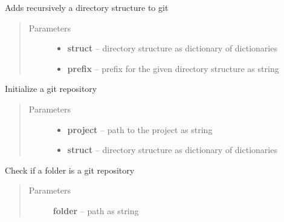 \documentclass[letterpaper,10pt,english]{sphinxmanual}
\begin{document}
\begin{fulllineitems}
\label{_rst/pyscaffold:pyscaffold.repo.git_tree_add}
Adds recursively a directory structure to git
\begin{quote}\begin{description}
\item[{Parameters}] \leavevmode\begin{itemize}
\item {} 
\textbf{struct} -- directory structure as dictionary of dictionaries

\item {} 
\textbf{prefix} -- prefix for the given directory structure as string

\end{itemize}

\end{description}\end{quote}

\end{fulllineitems}


\begin{fulllineitems}
\label{_rst/pyscaffold:pyscaffold.repo.init_commit_repo}
Initialize a git repository
\begin{quote}\begin{description}
\item[{Parameters}] \leavevmode\begin{itemize}
\item {} 
\textbf{project} -- path to the project as string

\item {} 
\textbf{struct} -- directory structure as dictionary of dictionaries

\end{itemize}

\end{description}\end{quote}

\end{fulllineitems}


\begin{fulllineitems}
\label{_rst/pyscaffold:pyscaffold.repo.is_git_repo}
Check if a folder is a git repository
\begin{quote}\begin{description}
\item[{Parameters}] \leavevmode
\textbf{folder} -- path as string

\end{description}\end{quote}

\end{fulllineitems}
\end{document}
